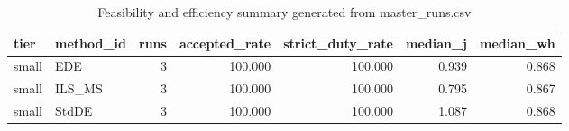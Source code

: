 \begin{table}[!t]
\centering
\caption{Feasibility and efficiency summary generated from master_runs.csv}
\label{tab:feasibility_summary_generated}
\begin{tabular}{llrrrrr}
\toprule
tier & method_id & runs & accepted_rate & strict_duty_rate & median_j & median_wh \\
\midrule
small & EDE & 3 & 100.000 & 100.000 & 0.939 & 0.868 \\
small & ILS_MS & 3 & 100.000 & 100.000 & 0.795 & 0.867 \\
small & StdDE & 3 & 100.000 & 100.000 & 1.087 & 0.868 \\
\bottomrule
\end{tabular}

\end{table}
